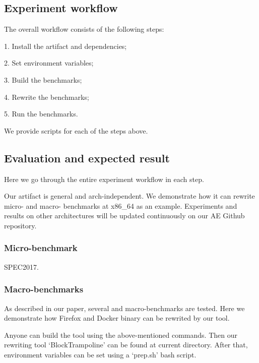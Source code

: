 \documentclass{sigplanconf}
\begin{document}
{%
\subsection{Experiment workflow}

The overall workflow consists of the following steps:

1. Install the artifact and dependencies;

2. Set environment variables;

3. Build the benchmarks;

4. Rewrite the benchmarks;

5. Run the benchmarks.

We provide scripts for each of the steps above.

\subsection{Evaluation and expected result}


Here we go through the entire experiment workflow in each step.

Our artifact is general and arch-independent. We demonstrate how it can rewrite micro-
and macro- benchmarks at x86\_64 as an example. Experiments and results on other architectures will be
updated continuously on our AE Github repository.



\subsubsection{Micro-benchmark}

SPEC2017.

\subsubsection{Macro-benchmarks}

As described in our paper, several and macro-benchmarks are tested. 
Here we demonstrate how Firefox and Docker binary can be rewrited by our tool.

Anyone can build the tool using the above-mentioned commands.
Then our rewriting tool `BlockTrampoline' can be found at current directory.
After that, environment variables can be set using a `prep.sh' bash script.

}
\end{document}
